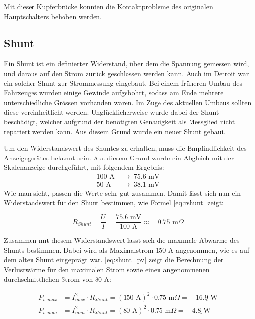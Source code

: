 {Mit dieser Kupferbrücke konnten die Kontaktprobleme des originalen Hauptschalters behoben werden.


\subsection{Shunt}
Ein Shunt ist ein definierter Widerstand, über dem die Spannung gemessen wird, und daraus auf den Strom zurück geschlossen werden kann. Auch im Detroit war ein solcher Shunt zur Strommessung eingebaut. Bei einem früheren Umbau des Fahrzeuges wurden einige Gewinde aufgebohrt, sodass am Ende mehrere unterschiedliche Grössen vorhanden waren. Im Zuge des aktuellen Umbaus sollten diese vereinheitlicht werden. Unglücklicherweise wurde dabei der Shunt beschädigt, welcher aufgrund der benötigten Genauigkeit als Messglied nicht repariert werden kann. Aus diesem Grund wurde ein neuer Shunt gebaut.

Um den Widerstandswert des Shuntes zu erhalten, muss die Empfindlichkeit des Anzeigegerätes bekannt sein. Aus diesem Grund wurde ein Abgleich mit der Skalenanzeige durchgeführt, mit folgendem Ergebnis:
\begin{equation*}\begin{aligned}
	100\text{ A}\ &\rightarrow\ 75.6\text{ mV}\\
	50\text{ A}\ &\rightarrow\ 38.1\text{ mV}
\end{aligned}\end{equation*}
Wie man sieht, passen die Werte sehr gut zusammen. Damit lässt sich nun ein Widerstandswert für den Shunt bestimmen, wie Formel \ref{eq:rshunt} zeigt:

\begin{equation}
R_{Shunt}=\frac{U}{I}=\frac{75.6\text{ mV}}{100\text{ A}}\approx\quad\underline{0.75\text{ m}\Omega}
\label{eq:rshunt}
\end{equation}

Zusammen mit diesem Widerstandswert lässt sich die maximale Abwärme des Shunts bestimmen. Dabei wird als Maximalstrom $150$ A angenommen, wie es auf dem alten Shunt eingeprägt war. \ref{eq:shunt_pv} zeigt die Berechnung der Verlustwärme für den maximalen Strom sowie einen angenommenen durchschnittlichen Strom von $80$ A:

\begin{equation}\begin{aligned}
	P_{v,max}&=I_{max}^2\cdot R_{Shunt}=\left(150\text{ A}\right)^2\cdot0.75\text{ m}\Omega=\quad\underline{16.9\text{ W}}\\[6pt]
	P_{v,nom}&=I_{nom}^2\cdot R_{Shunt}=\left(80\text{ A}\right)^2\cdot0.75\text{ m}\Omega=\quad\underline{4.8 \text{ W}}
\label{eq:shunt_pv}
\end{aligned}\end{equation}

}
